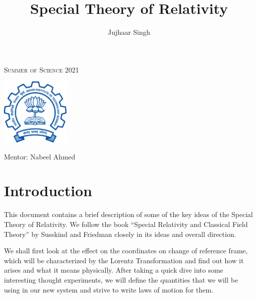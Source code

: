 \documentclass[16pt]{scrartcl}
\title{Special Theory of Relativity}
\author{
    Jujhaar Singh
}
\date{}
\numberwithin{equation}{section}
\theoremstyle{plain}
\theoremstyle{definition}
\newcommand{\myfont}{\fontfamily{cmss}\selectfont}
\newcommand{\myfontb}[1]{\textbf{\myfont #1}}
\begin{document}


\pagebreak

\begin{titlepage}
    \centering
    {\scshape\LARGE Summer of Science 2021 \par}
    \vspace{1.5cm}
    \includegraphics[width = 0.25\textwidth]
    {img/iitb_logo}\par
    \vspace{1cm}
    {\Huge \myfontb \@title \par}
    \vspace{3cm}
    {\Large\myfont
        \@author \par
        \large
        Mentor: Nabeel Ahmed
        \vfill
        {\large \@date \par}
    }\end{titlepage}

\pagebreak
\thispagestyle{empty}
\tableofcontents
\pagebreak

\setcounter{page}{1}


\section*{Introduction}
This document contains a brief description of some of the key ideas of the Special Theory of Relativity. We follow the book ``Special Relativity and Classical Field Theory'' by Susskind and Friedman closely in its ideas and overall direction.

We shall first look at the effect on the coordinates on change of reference frame, which will be characterized by the Lorentz Transformation and find out how it arises and what it means physically. After taking a quick dive into some interesting thought experiments, we will define the quantities that we will be using in our new system and strive to write laws of motion for them.

\pagebreak
\end{document}

